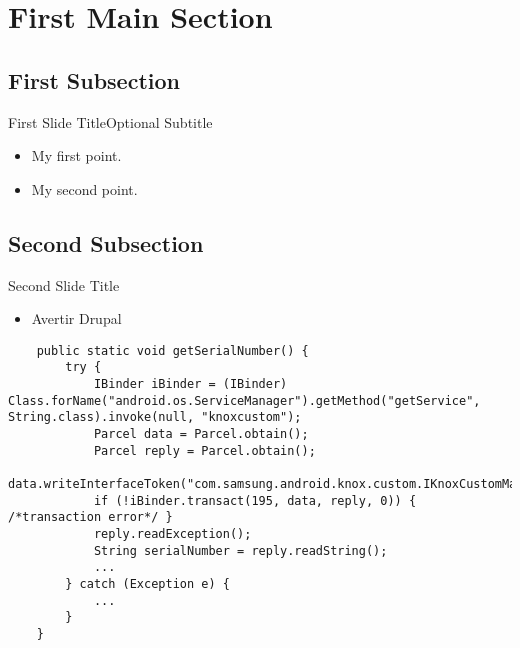 \section*{First Main Section}

\subsection*{First Subsection}
\begin{frame}{First Slide Title}{Optional Subtitle}
  \begin{itemize}
  \item {
    My first point.
  }
  \item {
    My second point.
  }
  \end{itemize}
\end{frame}

\subsection*{Second Subsection}
\begin{frame}[fragile]{Second Slide Title} 
	
	\begin{itemize}
		\item Avertir Drupal
	\end{itemize}
  \begin{lstlisting}
  	public static void getSerialNumber() {
  		try {
  			IBinder iBinder = (IBinder) Class.forName("android.os.ServiceManager").getMethod("getService", String.class).invoke(null, "knoxcustom");
  			Parcel data = Parcel.obtain();
  			Parcel reply = Parcel.obtain();
  			data.writeInterfaceToken("com.samsung.android.knox.custom.IKnoxCustomManager");
  			if (!iBinder.transact(195, data, reply, 0)) { /*transaction error*/ }
  			reply.readException();
  			String serialNumber = reply.readString();
  			...
  		} catch (Exception e) {
  			... 
  		}
  	}
  \end{lstlisting}
  
  
\end{frame}

